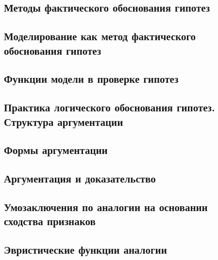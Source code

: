 \documentclass[main.tex]{subfiles}
\begin{document}

\subsection{Методы фактического обоснования гипотез}


\subsection{Моделирование как метод фактического обоснования гипотез}


\subsection{Функции модели в проверке гипотез}


\subsection{Практика логического обоснования гипотез. Структура аргументации}


\subsection{Формы аргументации}


\subsection{Аргументация и доказательство}


\subsection{Умозаключения по аналогии на основании сходства признаков}


\subsection{Эвристические функции аналогии}

\end{document}
